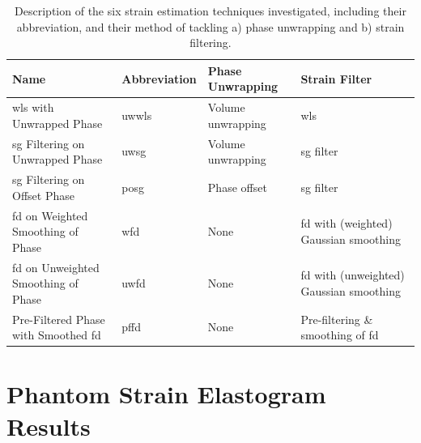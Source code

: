 \begin{table}[h]
	\centering
	\begin{tabularx}{\textwidth}{YlYY}
		\toprule
		Name & Abbreviation & Phase Unwrapping & Strain Filter \\
		\midrule
		\ac{wls} with Unwrapped Phase & \ac{uwwls} & Volume unwrapping & \ac{wls} \\
		\ac{sg} Filtering on Unwrapped Phase & \ac{uwsg} & Volume unwrapping & \ac{sg} filter \\
		\ac{sg} Filtering on Offset Phase & \ac{posg} & Phase offset & \ac{sg} filter \\
		\ac{fd} on Weighted Smoothing of Phase & \ac{wfd} & None & \ac{fd} with (weighted) Gaussian smoothing \\
		\ac{fd} on Unweighted Smoothing of Phase & \ac{uwfd} & None & \ac{fd} with (unweighted) Gaussian smoothing \\
		Pre-Filtered Phase with Smoothed \ac{fd} & \ac{pffd} & None & Pre-filtering \& smoothing of \ac{fd} \\
		\bottomrule
	\end{tabularx}
	\caption{Description of the six strain estimation techniques investigated, including their abbreviation, and their method of tackling a) phase unwrapping and b) strain filtering.}
	\label{strain_methods}
\end{table}

\section{Phantom Strain Elastogram Results}\label{phantom_results}


